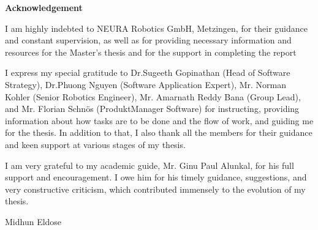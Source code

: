 \documentclass[12pt]{article}
\begin{document}
\newpage
\tableofcontents
\newpage
\listoffigures
{}
\newpage
\listoftables
{}
\newpage
\raggedright
\newpage
\raggedright
{}
\begin{center}
    \textbf{Acknowledgement}
\end{center}
    \raggedright

    I am highly indebted to NEURA Robotics GmbH, Metzingen, for their guidance and constant supervision, as well as for providing necessary information and resources for the Master's thesis and for the support in completing the report

    \vspace{1cm}
    
    I express my special gratitude to Dr.Sugeeth Gopinathan (Head of Software Strategy), Dr.Phuong Nguyen (Software Application Expert), Mr. Norman Kohler (Senior Robotics Engineer), Mr. Amarnath Reddy Bana (Group Lead), and Mr. Florian Schnös (ProduktManager Software) for instructing, providing information about how tasks are to be done and the flow of work, and guiding me for the thesis. In addition to that, I also thank all the members for their guidance and keen support at various stages of my thesis.

    \vspace{1cm}

    I am very grateful to my academic guide, Mr. Ginu Paul Alunkal, for his full support and encouragement. I owe him for his timely guidance, suggestions, and very constructive criticism, which contributed immensely to the evolution of my thesis.
    
    \vspace{1.5 cm}
    
    \raggedleft
    Midhun Eldose
\end{document}
